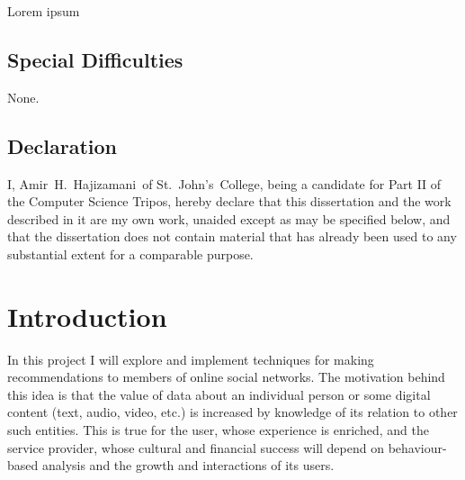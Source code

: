 \documentclass[a4paper,12pt,twoside,notitlepage,draft]{report}
\def\authorname{Amir~H.~Hajizamani}
\def\authorcollege{St.~John's~College}
\begin{document}
Lorem ipsum

\section*{Special Difficulties}

None.

\clearpage

\section*{Declaration}

I, \authorname~of \authorcollege, being a candidate for Part II of the Computer
Science Tripos, hereby declare that this dissertation and the work described in
it are my own work, unaided except as may be specified below, and that
the dissertation does not contain material that has already been used to any
substantial extent for a comparable purpose.

\bigskip
{}

\medskip
{}

\vfill

\clearpage

\tableofcontents
\clearpage




\chapter{Introduction}


In this project I will explore and implement techniques for making 
recommendations to members of online social networks. The motivation behind 
this idea is that the value of data about an individual person or some digital 
content (text, audio, video, etc.) is increased by knowledge of its relation to 
other such entities. This is true for the user, whose experience is enriched, 
and the service provider, whose cultural and financial success will depend on 
behaviour-based analysis and the growth and interactions of its users.
\end{document}
